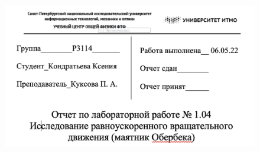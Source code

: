 \documentclass[12pt]{article}
\begin{document}
    
    \begin{figure}[H]
    
        \centering
        
        \includegraphics[width=1.05\linewidth]{title.png}
        \label{fig:mpr}
        
    \end{figure}
\end{document}
